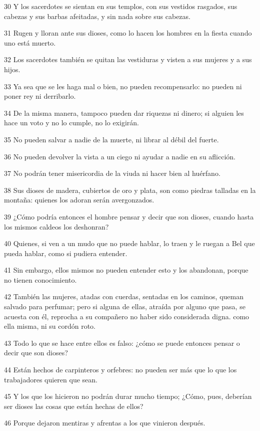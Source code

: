 \par 30 Y los sacerdotes se sientan en sus templos, con sus vestidos rasgados, sus cabezas y sus barbas afeitadas, y sin nada sobre sus cabezas.
\par 31 Rugen y lloran ante sus dioses, como lo hacen los hombres en la fiesta cuando uno está muerto.
\par 32 Los sacerdotes también se quitan las vestiduras y visten a sus mujeres y a sus hijos.
\par 33 Ya sea que se les haga mal o bien, no pueden recompensarlo: no pueden ni poner rey ni derribarlo.
\par 34 De la misma manera, tampoco pueden dar riquezas ni dinero; si alguien les hace un voto y no lo cumple, no lo exigirán.
\par 35 No pueden salvar a nadie de la muerte, ni librar al débil del fuerte.
\par 36 No pueden devolver la vista a un ciego ni ayudar a nadie en su aflicción.
\par 37 No podrán tener misericordia de la viuda ni hacer bien al huérfano.
\par 38 Sus dioses de madera, cubiertos de oro y plata, son como piedras talladas en la montaña: quienes los adoran serán avergonzados.
\par 39 ¿Cómo podría entonces el hombre pensar y decir que son dioses, cuando hasta los mismos caldeos los deshonran?
\par 40 Quienes, si ven a un mudo que no puede hablar, lo traen y le ruegan a Bel que pueda hablar, como si pudiera entender.
\par 41 Sin embargo, ellos mismos no pueden entender esto y los abandonan, porque no tienen conocimiento.
\par 42 También las mujeres, atadas con cuerdas, sentadas en los caminos, queman salvado para perfumar; pero si alguna de ellas, atraída por alguno que pasa, se acuesta con él, reprocha a su compañero no haber sido considerada digna. como ella misma, ni su cordón roto.
\par 43 Todo lo que se hace entre ellos es falso: ¿cómo se puede entonces pensar o decir que son dioses?
\par 44 Están hechos de carpinteros y orfebres: no pueden ser más que lo que los trabajadores quieren que sean.
\par 45 Y los que los hicieron no podrán durar mucho tiempo; ¿Cómo, pues, deberían ser dioses las cosas que están hechas de ellos?
\par 46 Porque dejaron mentiras y afrentas a los que vinieron después.
